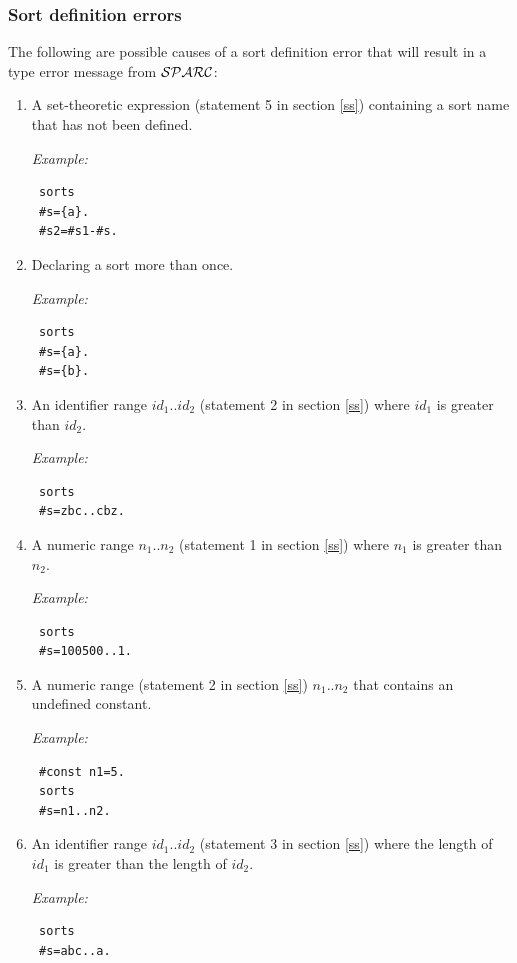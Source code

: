 \documentclass[12pt, letterpaper]{article}
\begin{document}
\subsubsection{Sort definition errors}
The following are possible causes of a sort definition error  that will result in a type error  message from ${\cal SPARC}$:
\begin{enumerate}
\item  A set-theoretic expression (statement 5 in section \ref{ss}) containing a sort name that has not been defined.

\textit{Example:}
\begin{verbatim}
 sorts
 #s={a}.
 #s2=#s1-#s.
\end{verbatim}

\item  Declaring a sort more than once.

\textit{Example:}
\begin{verbatim}
 sorts
 #s={a}.
 #s={b}.
\end{verbatim}

\item An identifier range $id_1..id_2$ (statement 2 in section \ref{ss}) where $id_1$ is greater than $id_2$.

\textit{Example:}
\begin{verbatim}
 sorts
 #s=zbc..cbz.
\end{verbatim}

\item A numeric range $n_1..n_2$ (statement 1 in section \ref{ss}) where  $n_1$ is greater than $n_2$.

\textit{Example:}
\begin{verbatim}
 sorts
 #s=100500..1.
\end{verbatim}


\item A numeric range (statement 2 in section \ref{ss}) $n_1..n_2$ that  contains an undefined constant.

\textit{Example:}
\begin{verbatim}
 #const n1=5.
 sorts
 #s=n1..n2.
\end{verbatim}

\item An identifier range $id_1..id_2$ (statement 3 in section \ref{ss}) where  the length of $id_1$ is greater than the length of $id_2$. 


\textit{Example:}
\begin{verbatim}
 sorts
 #s=abc..a.
\end{verbatim}


\end{enumerate}
\end{document}
